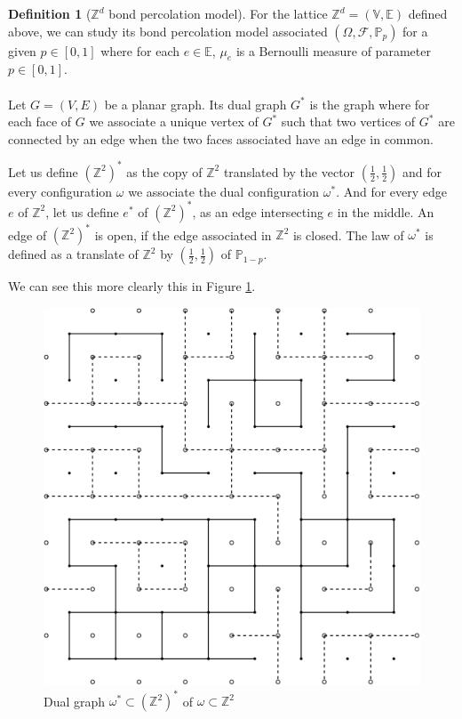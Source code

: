 \documentclass[a4paper,11pt]{article}
\theoremstyle{plain}
\theoremstyle{definition}
\newtheorem{definition}[theorem]{Definition}
\theoremstyle{remark}
\begin{document}
\begin{definition}[$\mathbb{Z}^d$ bond percolation model]
For the lattice $\mathbb{Z}^d = (\mathbb{V}, \mathbb{E})$ defined above, we can study its bond percolation model associated $(\Omega, \mathscr{F}, \mathbb{P}_p)$ for a given $p \in [0,1]$ where for each $e\in\mathbb{E}$, $\mu_{e}$ is a Bernoulli measure of parameter $p\in [0,1]$.

\paragraph{}
Let $G = (V, E)$ be a planar graph. Its dual graph $G^*$ is the graph where for each face of $G$ we associate a unique vertex of $G^*$ such that two vertices of $G^*$ are connected by an edge when the two faces associated have an edge in common.

Let us define $(\mathbb{Z}^2)^*$ as the copy of $\mathbb{Z}^2$ translated by the vector $(\frac{1}{2}, \frac{1}{2})$ and for every configuration $\omega$ we associate the dual configuration $\omega^*$. And for every edge $e$ of $\mathbb{Z}^2$, let us define $e^*$ of $(\mathbb{Z}^2)^*$, as an edge intersecting $e$ in the middle. An edge of $(\mathbb{Z}^2)^*$ is open, if the edge associated in $\mathbb{Z}^2$ is closed. The law of $\omega^*$ is defined as a translate of $\mathbb{Z}^2$ by $(\frac{1}{2}, \frac{1}{2})$ of $\mathbb{P}_{1-p}$.

We can see this more clearly this in Figure \ref{fig:dual_graph}.

\begin{figure}
    \centering
    \includegraphics[scale=0.75]{dualgraph.png}
    \caption{Dual graph $\omega^* \subset (\mathbb{Z}^2)^*$ of $\omega \subset \mathbb{Z}^2$}
    \label{fig:dual_graph}
\end{figure}

\end{definition}
\end{document}
